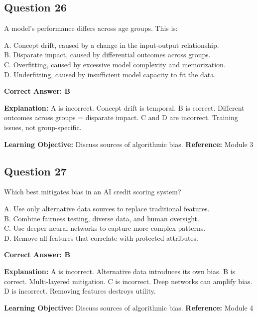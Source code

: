 \documentclass[11pt]{article}
\begin{document}
	\subsection*{Question 26}
	A model's performance differs across age groups. This is:
	
	A. Concept drift, caused by a change in the input-output relationship.\\
	B. Disparate impact, caused by differential outcomes across groups.\\
	C. Overfitting, caused by excessive model complexity and memorization.\\
	D. Underfitting, caused by insufficient model capacity to fit the data.
	
	\vspace{0.4em}
	\textbf{Correct Answer: B}
	
	\textbf{Explanation:}
	A is incorrect. Concept drift is temporal.
	B is correct. Different outcomes across groups = disparate impact.
	C and D are incorrect. Training issues, not group-specific.
	
	\textbf{Learning Objective:} Discuss sources of algorithmic bias.
	\textbf{Reference:} Module 3
	
	\subsection*{Question 27}
	Which best mitigates bias in an AI credit scoring system?
	
	A. Use only alternative data sources to replace traditional features.\\
	B. Combine fairness testing, diverse data, and human oversight.\\
	C. Use deeper neural networks to capture more complex patterns.\\
	D. Remove all features that correlate with protected attributes.
	
	\vspace{0.4em}
	\textbf{Correct Answer: B}
	
	\textbf{Explanation:}
	A is incorrect. Alternative data introduces its own bias.
	B is correct. Multi-layered mitigation.
	C is incorrect. Deep networks can amplify bias.
	D is incorrect. Removing features destroys utility.
	
	\textbf{Learning Objective:} Discuss sources of algorithmic bias.
	\textbf{Reference:} Module 4
	
\end{document}
